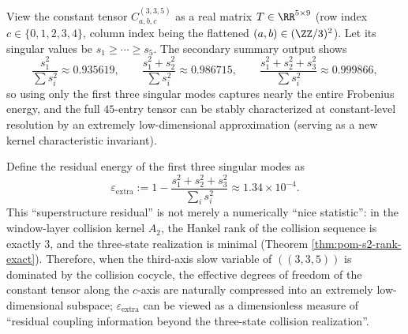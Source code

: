 \begin{remark}\label{prop:arity-335-low-rank}
View the constant tensor $C^{(3,3,5)}_{a,b,c}$ as a real matrix $T\in\RR^{5\times 9}$ (row index $c\in\{0,1,2,3,4\}$, column index being the flattened $(a,b)\in(\ZZ/3)^2$). Let its singular values be $s_1\ge \cdots\ge s_5$. The secondary summary output shows
\[
\frac{s_1^2}{\sum s_i^2}\approx 0.935619,\qquad
\frac{s_1^2+s_2^2}{\sum s_i^2}\approx 0.986715,\qquad
\frac{s_1^2+s_2^2+s_3^2}{\sum s_i^2}\approx 0.999866,
\]
so using only the first three singular modes captures nearly the entire Frobenius energy, and the full $45$-entry tensor can be stably characterized at constant-level resolution by an extremely low-dimensional approximation (serving as a new kernel characteristic invariant).
\end{remark}

\begin{remark}\label{rem:arity-335-low-rank-vs-hankel}
Define the residual energy of the first three singular modes as
\[
\varepsilon_{\mathrm{extra}}
:=1-\frac{s_1^2+s_2^2+s_3^2}{\sum_i s_i^2}\approx 1.34\times 10^{-4}.
\]
This ``superstructure residual'' is not merely a numerically ``nice statistic'': in the window-layer collision kernel \(A_2\), the Hankel rank of the collision sequence is exactly \(3\), and the three-state realization is minimal (Theorem \ref{thm:pom-s2-rank-exact}).
Therefore, when the third-axis slow variable of \(((3,3,5))\) is dominated by the collision cocycle, the effective degrees of freedom of the constant tensor along the \(c\)-axis are naturally compressed into an extremely low-dimensional subspace; \(\varepsilon_{\mathrm{extra}}\) can be viewed as a dimensionless measure of ``residual coupling information beyond the three-state collision realization''.
\end{remark}

